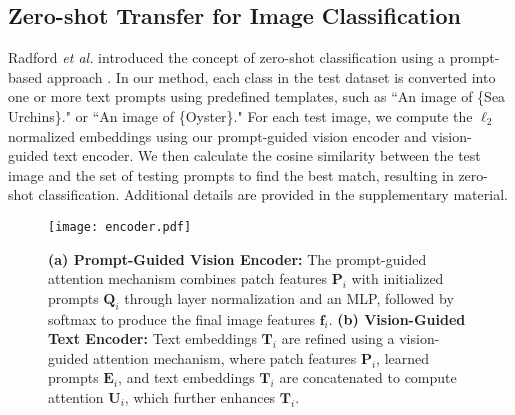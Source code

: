 \subsection{Zero-shot Transfer for Image Classification}
Radford \textit{et al.} introduced the concept of zero-shot classification using a prompt-based approach \cite{radford2021learning}.
In our method, each class in the test dataset is converted into one or more text prompts using predefined templates, such as ``An image of \{Sea Urchins\}." or ``An image of \{Oyster\}." 
For each test image, we compute the $\ell_{2}$ normalized embeddings using our prompt-guided vision encoder and vision-guided text encoder. 
We then calculate the cosine similarity between the test image and the set of testing prompts to find the best match, resulting in zero-shot classification. 
Additional details are provided in the supplementary material.

\begin{figure}[t!]
    \centering    
    \texttt{[image: encoder.pdf]}
    \caption{\textbf{(a) Prompt-Guided Vision Encoder:} The prompt-guided attention mechanism combines patch features $\textbf{P}_{i}$ with initialized prompts $\textbf{Q}_{i}$ through layer normalization and an MLP, followed by softmax to produce the final image features $\textbf{f}_{i}$.
\textbf{(b) Vision-Guided Text Encoder:} Text embeddings $\textbf{T}_{i}$ are refined using a vision-guided attention mechanism, where patch features $\textbf{P}_{i}$, learned prompts $\textbf{E}_{i}$, and text embeddings $\textbf{T}_{i}$ are concatenated to compute attention $\textbf{U}_{i}$, which further enhances $\textbf{T}_{i}$.}
    \label{encoder}
    \end{figure}